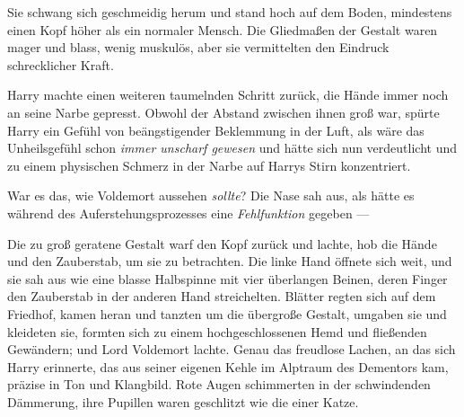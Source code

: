 Sie schwang sich geschmeidig herum und stand hoch auf dem Boden, mindestens einen Kopf höher als ein normaler Mensch. Die Gliedmaßen der Gestalt waren mager und blass, wenig muskulös, aber sie vermittelten den Eindruck schrecklicher Kraft.

Harry machte einen weiteren taumelnden Schritt zurück, die Hände immer noch an seine Narbe gepresst. Obwohl der Abstand zwischen ihnen groß war, spürte Harry ein Gefühl von beängstigender Beklemmung in der Luft, als wäre das Unheilsgefühl schon \emph{immer unscharf gewesen} und hätte sich nun verdeutlicht und zu einem physischen Schmerz in der Narbe auf Harrys Stirn konzentriert.

War es das, wie Voldemort aussehen \emph{sollte}? Die Nase sah aus, als hätte es während des Auferstehungsprozesses eine \emph{Fehlfunktion} gegeben —

Die zu groß geratene Gestalt warf den Kopf zurück und lachte, hob die Hände und den Zauberstab, um sie zu betrachten. Die linke Hand öffnete sich weit, und sie sah aus wie eine blasse Halbspinne mit vier überlangen Beinen, deren Finger den Zauberstab in der anderen Hand streichelten. Blätter regten sich auf dem Friedhof, kamen heran und tanzten um die übergroße Gestalt, umgaben sie und kleideten sie, formten sich zu einem hochgeschlossenen Hemd und fließenden Gewändern; und Lord Voldemort lachte. Genau das freudlose Lachen, an das sich Harry erinnerte, das aus seiner eigenen Kehle im Alptraum des Dementors kam, präzise in Ton und Klangbild.
Rote Augen schimmerten in der schwindenden Dämmerung, ihre Pupillen waren geschlitzt wie die einer Katze.

